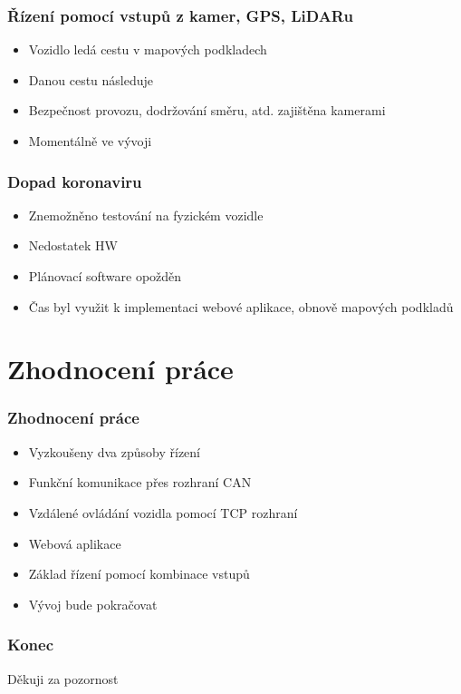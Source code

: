 \documentclass{beamer}
\begin{document}
\begin{frame}
    \frametitle{Řízení pomocí vstupů z kamer, GPS, LiDARu}
    \begin{itemize}
        \item Vozidlo ledá cestu v mapových podkladech
        \item Danou cestu následuje
        \item Bezpečnost provozu, dodržování směru, atd. zajištěna kamerami
        \item Momentálně ve vývoji
    \end{itemize}
\end{frame}

\begin{frame}
    \frametitle{Dopad koronaviru}
    \begin{itemize}
        \item Znemožněno testování na fyzickém vozidle
        \item Nedostatek HW
        \item Plánovací software opožděn
        \item Čas byl využit k implementaci webové aplikace, obnově mapových podkladů
    \end{itemize}
\end{frame}

\section{Zhodnocení práce}

\begin{frame}
    \frametitle{Zhodnocení práce}
    \begin{itemize}
        \item Vyzkoušeny dva způsoby řízení
        \item Funkční komunikace přes rozhraní CAN
        \item Vzdálené ovládání vozidla pomocí TCP rozhraní
        \item Webová aplikace
        \item Základ řízení pomocí kombinace vstupů
        \item Vývoj bude pokračovat
    \end{itemize}
\end{frame}

\begin{frame}
    \frametitle{Konec}
    \begin{center}
        Děkuji za pozornost
    \end{center}
\end{frame}
\end{document}
